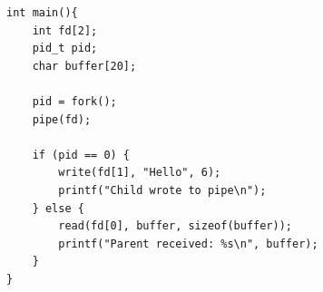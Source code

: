 \begin{slide}


\begin{verbatim}
int main(){
    int fd[2];
    pid_t pid;
    char buffer[20];

    pid = fork(); 
    pipe(fd);

    if (pid == 0) {  
        write(fd[1], "Hello", 6);
        printf("Child wrote to pipe\n");
    } else {  
        read(fd[0], buffer, sizeof(buffer));
        printf("Parent received: %s\n", buffer);
    }
}
\end{verbatim}
	
\end{slide}


